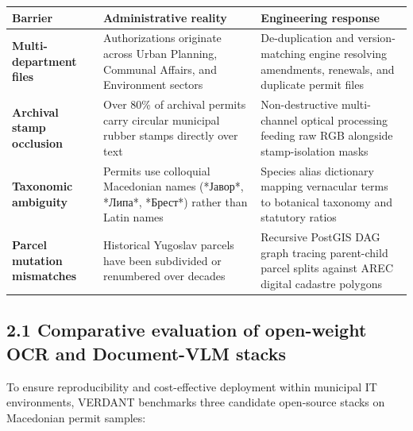 \documentclass[9pt,a4paper]{article}
\begin{document}
\vspace{0.1em}
\renewcommand{\arraystretch}{0.92}
\begin{tabularx}{\textwidth}{@{}lXX@{}}
\toprule
\textsf{\textbf{\fontsize{8pt}{10pt}\selectfont Barrier}} & \textsf{\textbf{\fontsize{8pt}{10pt}\selectfont Administrative reality}} & \textsf{\textbf{\fontsize{8pt}{10pt}\selectfont Engineering response}} \\
\midrule
\textbf{Multi-department files} & Authorizations originate across Urban Planning, Communal Affairs, and Environment sectors & De-duplication and version-matching engine resolving amendments, renewals, and duplicate permit files \\
\textbf{Archival stamp occlusion} & Over 80\% of archival permits carry circular municipal rubber stamps directly over text & Non-destructive multi-channel optical processing feeding raw RGB alongside stamp-isolation masks \\
\textbf{Taxonomic ambiguity} & Permits use colloquial Macedonian names (*Јавор*, *Липа*, *Брест*) rather than Latin names & Species alias dictionary mapping vernacular terms to botanical taxonomy and statutory ratios \\
\textbf{Parcel mutation mismatches} & Historical Yugoslav parcels have been subdivided or renumbered over decades & Recursive PostGIS DAG graph tracing parent-child parcel splits against AREC digital cadastre polygons \\
\bottomrule
\end{tabularx}

\vspace{0.2em}
\subsection*{2.1 Comparative evaluation of open-weight OCR and Document-VLM stacks}
To ensure reproducibility and cost-effective deployment within municipal IT environments, VERDANT benchmarks three candidate open-source stacks on Macedonian permit samples:
\end{document}
